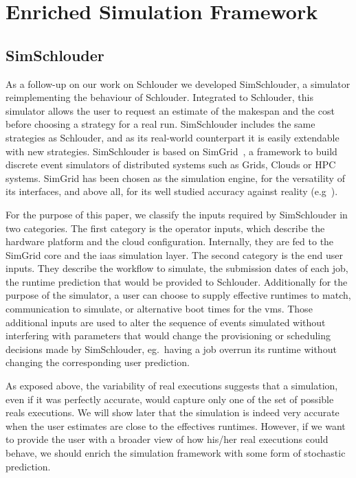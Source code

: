 \documentclass[10pt,conference,compsocconf]{IEEEtran}
\begin{document}
\section{Enriched Simulation Framework}
\label{sec:enriched-sim}

\subsection{SimSchlouder}

As a follow-up on our work on Schlouder we developed SimSchlouder, a simulator
reimplementing the behaviour of Schlouder. Integrated to Schlouder, this
simulator allows the user to request an estimate of the makespan and the cost
before choosing a strategy for a real run. SimSchlouder includes the same
strategies as Schlouder, and as its real-world counterpart it is easily
extendable with new strategies. SimSchlouder is based on SimGrid~\cite{simgrid},
a framework to build discrete event simulators of distributed systems such as
Grids, Clouds or HPC systems. SimGrid has been chosen as the simulation engine,
for the versatility of its interfaces, and above all, for its well studied
accuracy against reality (e.g~\cite{StanisicTLVM15,VelhoSCL13}).


For the purpose of this paper, we classify the inputs required by SimSchlouder
in two categories. The first category is the operator inputs, which describe the
hardware platform and the cloud configuration. Internally, they are fed to the
SimGrid core and the \ac{iaas} simulation layer. The second category is the end
user inputs. They describe the workflow to simulate, the submission dates of
each job, the runtime prediction that would be provided to Schlouder.
Additionally for the purpose of the simulator, a user can choose to supply
effective runtimes to match, communication to simulate, or alternative boot
times for the \acp{vm}. Those additional inputs are used to alter the sequence
of events simulated without interfering with parameters that would change the
provisioning or scheduling decisions made by SimSchlouder, eg.\ having a job
overrun its runtime without changing the corresponding user prediction.

As exposed above, the variability of real executions suggests that a simulation,
even if it was  perfectly accurate, would capture only one of the set
of possible reals  executions. We will show later that  the simulation is indeed
very   accurate  when   the  user   estimates  are   close  to   the  effectives
runtimes. However,  if we want to  provide the user  with a broader view  of how
his/her real executions could behave,  we should enrich the simulation framework
with some form of stochastic prediction.
\end{document}
